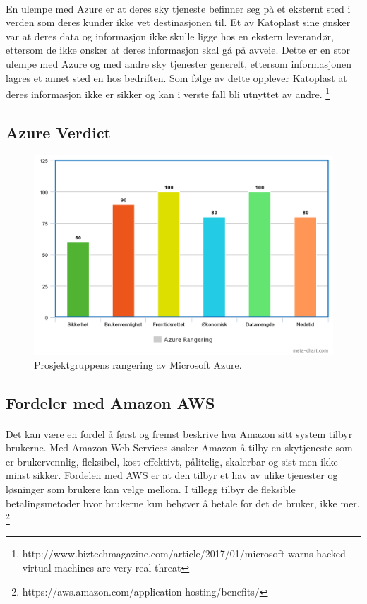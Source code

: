 \paragraph{} En ulempe med Azure er at deres sky tjeneste befinner seg på et eksternt sted i verden som deres kunder ikke vet destinasjonen til. Et av Katoplast sine ønsker var at deres data og informasjon ikke skulle ligge hos en ekstern leverandør, ettersom de ikke ønsker at deres informasjon skal gå på avveie. Dette er en stor ulempe med Azure og med andre sky tjenester generelt, ettersom informasjonen lagres et annet sted en hos bedriften. Som følge av dette opplever Katoplast at deres informasjon ikke er sikker og kan i verste fall bli utnyttet av andre.
\footnote{http://www.biztechmagazine.com/article/2017/01/microsoft-warns-hacked-virtual-machines-are-very-real-threat}

\subsection{Azure Verdict}
\begin{figure}[H]
\centering
\includegraphics[width=6.5in]{Bilder/azurechart.png}
\caption{Prosjektgruppens rangering av Microsoft Azure.}
\end{figure}

\subsection{Fordeler med Amazon AWS}
\paragraph{} Det kan være en fordel å først og fremst beskrive hva Amazon sitt system tilbyr brukerne. Med Amazon Web Services ønsker Amazon å tilby en skytjeneste som er brukervennlig, fleksibel, kost-effektivt, pålitelig, skalerbar og sist men ikke minst sikker. Fordelen med AWS er at den tilbyr et hav av ulike tjenester og løsninger som brukere kan velge mellom. I tillegg tilbyr de fleksible betalingsmetoder hvor brukerne kun behøver å betale for det de bruker, ikke mer.
\footnote{https://aws.amazon.com/application-hosting/benefits/}


